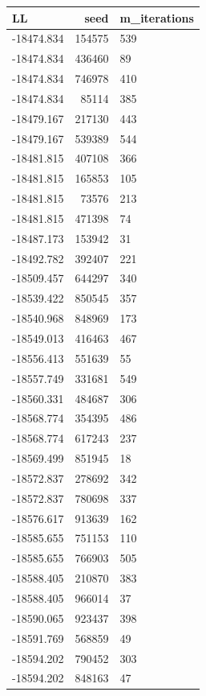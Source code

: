 \documentclass[]{book}
\theoremstyle{definition}
\theoremstyle{definition}
\theoremstyle{definition}
\theoremstyle{remark}
\begin{document}
\begin{tabular}{l|r|l}
\hline
LL & seed & m\_iterations\\
\hline
-18474.834 & 154575 & 539\\
\hline
-18474.834 & 436460 & 89\\
\hline
-18474.834 & 746978 & 410\\
\hline
-18474.834 & 85114 & 385\\
\hline
-18479.167 & 217130 & 443\\
\hline
-18479.167 & 539389 & 544\\
\hline
-18481.815 & 407108 & 366\\
\hline
-18481.815 & 165853 & 105\\
\hline
-18481.815 & 73576 & 213\\
\hline
-18481.815 & 471398 & 74\\
\hline
-18487.173 & 153942 & 31\\
\hline
-18492.782 & 392407 & 221\\
\hline
-18509.457 & 644297 & 340\\
\hline
-18539.422 & 850545 & 357\\
\hline
-18540.968 & 848969 & 173\\
\hline
-18549.013 & 416463 & 467\\
\hline
-18556.413 & 551639 & 55\\
\hline
-18557.749 & 331681 & 549\\
\hline
-18560.331 & 484687 & 306\\
\hline
-18568.774 & 354395 & 486\\
\hline
-18568.774 & 617243 & 237\\
\hline
-18569.499 & 851945 & 18\\
\hline
-18572.837 & 278692 & 342\\
\hline
-18572.837 & 780698 & 337\\
\hline
-18576.617 & 913639 & 162\\
\hline
-18585.655 & 751153 & 110\\
\hline
-18585.655 & 766903 & 505\\
\hline
-18588.405 & 210870 & 383\\
\hline
-18588.405 & 966014 & 37\\
\hline
-18590.065 & 923437 & 398\\
\hline
-18591.769 & 568859 & 49\\
\hline
-18594.202 & 790452 & 303\\
\hline
-18594.202 & 848163 & 47\\

\end{tabular}
\end{document}
